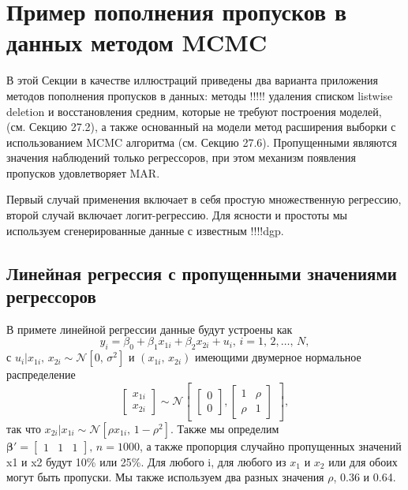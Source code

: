 \section{Пример пополнения пропусков в данных методом MCMC} 

В этой Секции в качестве иллюстраций приведены два варианта приложения методов пополнения пропусков в данных: методы !!!!! удаления списком listwise deletion и восстановления средним, которые не требуют построения моделей, (см. Секцию 27.2), а также основанный на модели метод расширения выборки с использованием MCMC алгоритма (см. Секцию 27.6). Пропущенными являются значения наблюдений только регрессоров, при этом механизм появления пропусков удовлетворяет MAR.

Первый случай применения включает в себя простую множественную регрессию, второй случай включает логит-регрессию. Для ясности и простоты мы используем сгенерированные данные с известным !!!!dgp.

\subsection{Линейная регрессия с пропущенными значениями регрессоров} 



В примете линейной регрессии данные будут устроены как
\begin{equation}
y_i=\beta_0+\beta_1 x_{1i}+\beta_2 x_{2i}+u_i, \, i=1, \, 2, \dots , \, N,
\end{equation}
с $u_i|x_{1i}, \, x_{2i} \sim \mathcal{N}[0, \, \sigma^2]$ и $(x_{1i}, \, x_{2i})$ имеющими двумерное нормальное распределение
\begin{equation}
\begin{bmatrix}
x_{1i} \\ x_{2i}
\end{bmatrix}
\sim \mathcal{N}
\begin{bmatrix}
\begin{bmatrix} 0 \\ 0 \end{bmatrix}, \begin{bmatrix} 1 & \rho \\ \rho & 1 \end{bmatrix}
\end{bmatrix},
\end{equation}
так что $x_{2i}|x_{1i} \sim \mathcal{N}[\rho x_{1i}, \, 1-\rho^2]$. Также мы определим $\mathbf{\beta'}=\begin{bmatrix} 1 & 1 & 1 \end{bmatrix}, \, n=1000$, а также пропорция случайно пропущенных значений x1 и x2 будут 10\% или 25\%. Для любого i, для любого из $x_1$ и $x_2$ или для обоих могут быть пропуски. Мы также используем два разных значения $\rho$, 0.36 и 0.64.

